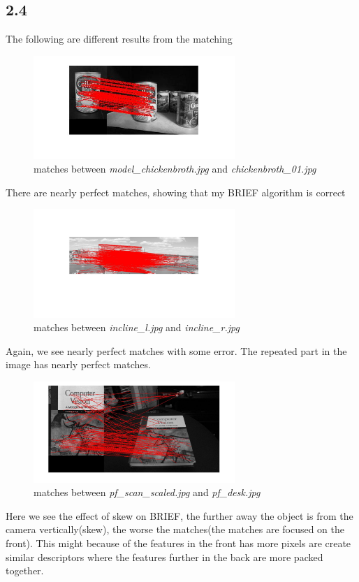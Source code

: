 \documentclass{article}
\begin{document}
\subsection*{2.4}
The following are different results from the matching
\begin{figure}[H]
    \centering
    \includegraphics[width=3.0in]{q2-4-1-1}
    \caption{matches between \textit{model\_chickenbroth.jpg} and \textit{chickenbroth\_01.jpg}}
\end{figure}
There are nearly perfect matches, showing that my BRIEF algorithm is correct
\begin{figure}[H]
    \centering
    \includegraphics[width=3.0in]{q2-4-1-2}
    \caption{matches between \textit{incline\_l.jpg} and \textit{incline\_r.jpg}}
\end{figure}
Again, we see nearly perfect matches with some error. The repeated part in the image has nearly perfect matches.
\begin{figure}[H]
    \centering
    \includegraphics[width=3.0in]{q2-4-1-3}
    \caption{matches between \textit{pf\_scan\_scaled.jpg} and \textit{pf\_desk.jpg}}
\end{figure}
Here we see the effect of skew on BRIEF, the further away the object is from the camera vertically(skew), the worse the matches(the matches are focused on the front). This might because of the features in the front has more pixels are create similar descriptors where the features further in the back are more packed together.
\end{document}
